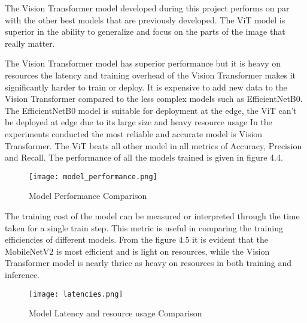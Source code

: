 The Vision Transformer model developed during this project performs on par with the other best models that are previously developed. The ViT model is superior in the ability to generalize and focus on the parts of the image that really matter. 

The Vision Transformer model has superior performance but it is heavy on resources the latency and training overhead of the Vision Transformer makes it significantly harder to train or deploy. It is expensive to add new data to the Vision Transformer compared to the less complex models such as EfficientNetB0. The EfficientNetB0 model is suitable for deployment at the edge, the ViT can't be deployed at edge due to its large size and heavy resource usage In the experiments conducted the most reliable and accurate model is Vision Transformer. The ViT beats all other model in all metrics of Accuracy, Precision and Recall. The performance of all the models trained is given in figure 4.4.

\begin{figure}[h!]
    \centering
    \texttt{[image: model\_performance.png]}
    \caption{Model Performance Comparison}
    \label{fig:model_performance}
\end{figure}

The training cost of the model can be measured or interpreted through the time taken for a single train step. This metric is useful in comparing the training efficiencies of different models. From the figure 4.5 it is evident that the MobileNetV2 is most efficient and is light on resources, while the Vision Transformer model is nearly thrice as heavy on resources in both training and inference. 

\begin{figure}[h!]
    \centering
    \texttt{[image: latencies.png]}
    \caption{Model Latency and resource usage Comparison}
    \label{fig:latency}
\end{figure}